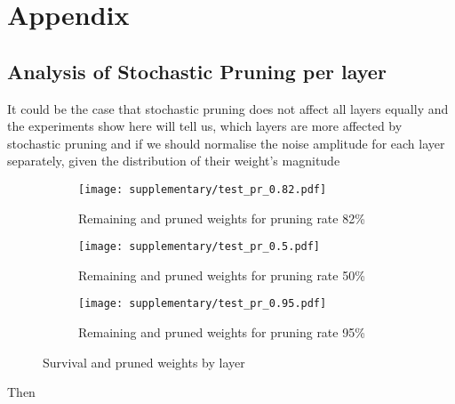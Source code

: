 \section{Appendix}
\subsection{Analysis of Stochastic Pruning per layer}

It could be the case that  stochastic pruning does not affect  all layers equally and the experiments show here  will tell us, which layers are more affected by stochastic pruning and if we should normalise the noise amplitude for each layer separately, given the distribution of their weight's magnitude

\begin{figure}[tb]
    \begin{subfigure}{}
        \centering
    \texttt{[image: supplementary/test\_pr\_0.82.pdf]}
    \caption{Remaining and pruned weights for pruning rate 82\%}
    \label{subfig:pr_0.82}
    \end{subfigure}
    \begin{subfigure}{}
    \texttt{[image: supplementary/test\_pr\_0.5.pdf]}
    \label{subfig:pr_0.5}
    \caption{Remaining and pruned weights for pruning rate 50\%}
    \end{subfigure}
    \begin{subfigure}{}
    \texttt{[image: supplementary/test\_pr\_0.95.pdf]}
    \caption{Remaining and pruned weights for pruning rate 95\%}
    \label{subfig:pr_0.95}
    \end{subfigure}
    \hfill
    \caption{Survival and pruned weights by layer}
\end{figure}
Then
